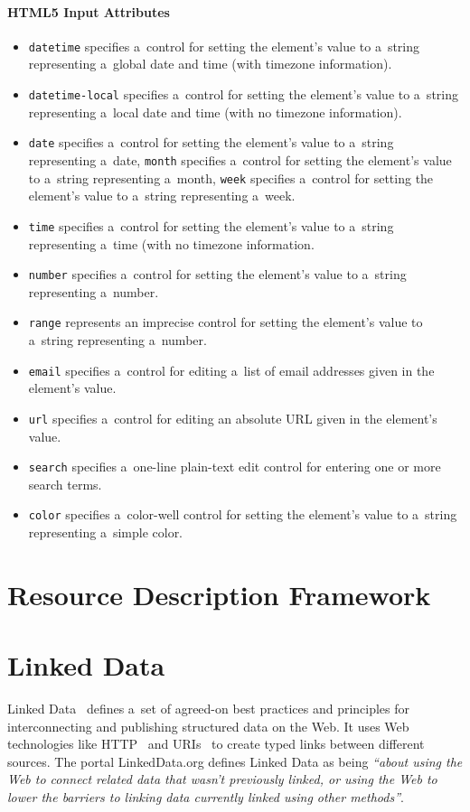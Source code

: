 \paragraph{HTML5 Input Attributes}
\begin{itemize}
\item \texttt{datetime} specifies a~control for setting the element's value
to a~string representing a~global date and time (with timezone information).
\item \texttt{datetime-local} specifies a~control for setting the element's value
to a~string representing a~local date and time (with no timezone information).
\item \texttt{date} specifies a~control for setting the element's value
to a~string representing a~date, \texttt{month} specifies a~control
for setting the element's value to a~string
representing a~month, \texttt{week} specifies a~control for setting the element's value
to a~string representing a~week.
\item \texttt{time} specifies a~control for setting the element's value
to a~string representing a~time (with no timezone information.
\item \texttt{number} specifies a~control for setting the element's value
to a~string representing a~number.
\item \texttt{range}  represents an imprecise control for setting the element's value
to a~string representing a~number.
\item \texttt{email} specifies a~control for editing a~list of email addresses
given in the element's value.
\item \texttt{url} specifies a~control for editing an absolute URL
given in the element's value.
\item \texttt{search} specifies a~one-line plain-text edit control
for entering one or more search terms.
\item \texttt{color} specifies a~color-well control for setting the element's value
to a~string representing a~simple color.
\end{itemize}

\section{Resource Description Framework}

\section{Linked Data}
Linked Data~\cite{BernersLee2006} defines a~set of agreed-on best practices and
principles for interconnecting and publishing structured data on the Web.
It uses Web technologies like HTTP~\cite{Fielding1999} and URIs~\cite{BernersLee2005}
to create typed links between different sources.
The portal LinkedData.org defines Linked Data as being
\textit{``about using the Web to connect related data that wasn't previously linked,
or using the Web to lower the barriers to linking data currently linked using other methods''}. 

